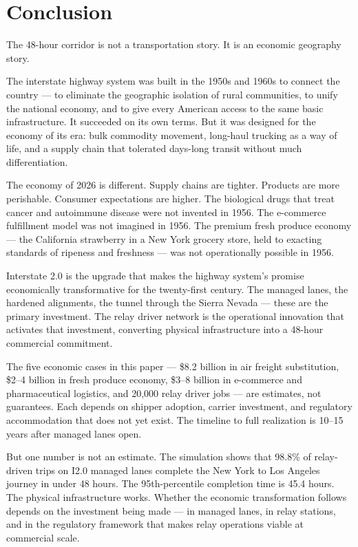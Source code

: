 \section{Conclusion}
\label{sec:conclusion}

The 48-hour corridor is not a transportation story. It is an economic geography story.

The interstate highway system was built in the 1950s and 1960s to connect the country ---
to eliminate the geographic isolation of rural communities, to unify the national economy,
and to give every American access to the same basic infrastructure. It succeeded on its
own terms. But it was designed for the economy of its era: bulk commodity movement, long-haul
trucking as a way of life, and a supply chain that tolerated days-long transit without
much differentiation.

The economy of 2026 is different. Supply chains are tighter. Products are more perishable.
Consumer expectations are higher. The biological drugs that treat cancer and autoimmune
disease were not invented in 1956. The e-commerce fulfillment model was not imagined
in 1956. The premium fresh produce economy --- the California strawberry in a New York
grocery store, held to exacting standards of ripeness and freshness --- was not operationally
possible in 1956.

Interstate 2.0 is the upgrade that makes the highway system's promise economically
transformative for the twenty-first century. The managed lanes, the hardened alignments,
the tunnel through the Sierra Nevada --- these are the primary investment. The relay driver
network is the operational innovation that activates that investment, converting physical
infrastructure into a 48-hour commercial commitment.

The five economic cases in this paper --- \$8.2 billion in air freight substitution,
\$2--4 billion in fresh produce economy, \$3--8 billion in e-commerce and pharmaceutical
logistics, and 20,000 relay driver jobs --- are estimates, not guarantees. Each depends
on shipper adoption, carrier investment, and regulatory accommodation that does not
yet exist. The timeline to full realization is 10--15 years after managed lanes open.

But one number is not an estimate. The simulation shows that 98.8\% of relay-driven
trips on I2.0 managed lanes complete the New York to Los Angeles journey in under 48 hours.
The 95th-percentile completion time is 45.4 hours. The physical infrastructure works.
Whether the economic transformation follows depends on the investment being made ---
in managed lanes, in relay stations, and in the regulatory framework that makes relay
operations viable at commercial scale.


